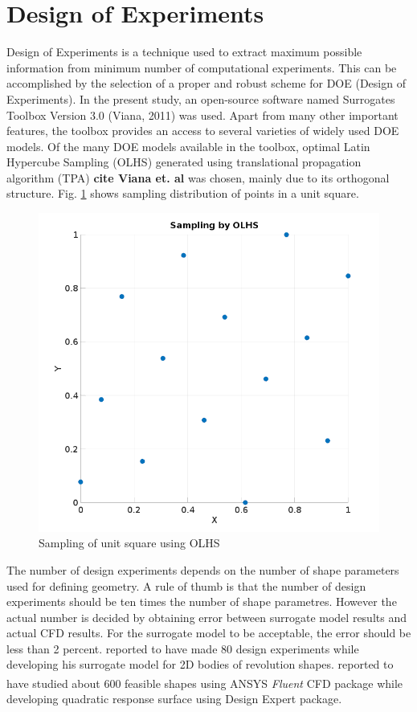 \section{Design of Experiments}
\label{DOE}
Design of Experiments is a technique used to extract maximum possible information from minimum number of computational experiments. This can be accomplished by the selection of a proper and robust scheme for DOE (Design of Experiments). In the present study, an open-source software named Surrogates Toolbox Version 3.0 (Viana, 2011) was used. Apart from many other important features, the toolbox provides an access to several varieties of widely used DOE models. Of the many DOE models available in the toolbox, optimal Latin Hypercube Sampling (OLHS) generated using translational propagation algorithm (TPA) \textbf{cite Viana et. al} was chosen, mainly due to its orthogonal structure. Fig. \ref{OLHS Sampling} shows sampling distribution of points in a unit square.

\begin{figure}[htbp]
	\centering
	\includegraphics[width=200 pt]{optimization/OLHS_DOE}
	\caption{Sampling of unit square using OLHS }
	\label{OLHS Sampling}
\end{figure}

 The number of design experiments depends on the number of shape parameters used for defining geometry. A rule of thumb is that the number of design experiments should be ten times the number of shape parametres. However the actual number is decided by obtaining error between surrogate model results and actual CFD results. For the surrogate model to be acceptable, the error should be less than 2 percent. \cite{alam2016mdo} reported to have made 80 design experiments while developing his surrogate model for 2D bodies of revolution shapes. \cite{Kale2005a} reported to have studied about 600 feasible shapes using ANSYS\textsuperscript{\textregistered} \textit{Fluent} CFD package while developing quadratic response surface using Design Expert package.

